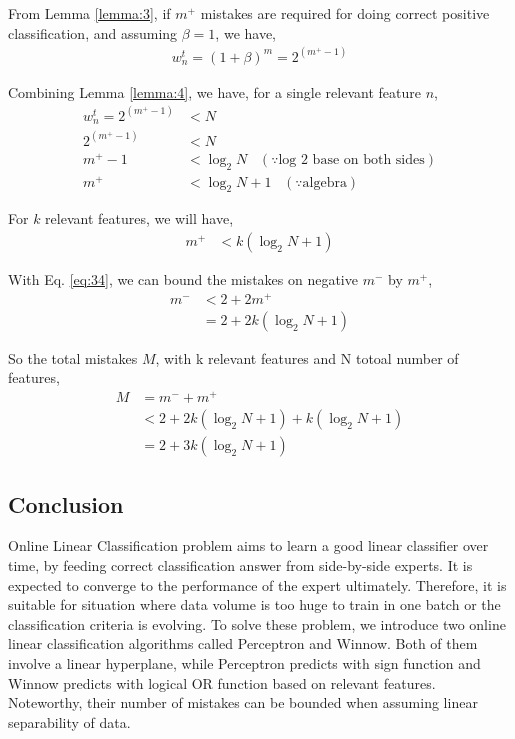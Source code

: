 \documentclass[11pt]{article}
\begin{document}
{From Lemma \ref{lemma:3}, if $m^+$ mistakes are required for doing correct positive classification, and assuming $\beta=1$, we have,
\begin{align}
    w^t_n = (1+\beta)^m = 2^{(m^+ - 1)}
\end{align}

Combining Lemma \ref{lemma:4}, we have, for a single relevant feature $n$, 
\begin{align}
    w^t_n = 2^{(m^+ - 1)} &< N \nonumber \\
    2^{(m^+ - 1)} &< N \nonumber \\
    m^{+}-1 &< \log _{2} N \nonumber \;\;\; (\because \text{log 2 base on both sides}) \\
    m^{+} &< \log _{2} N+1 \;\;\; (\because \text{algebra})
\end{align}

For $k$ relevant features, we will have,
\begin{align}
    m^{+} &< k(\log _{2} N+1)
\end{align}

With Eq. \ref{eq:34}, we can bound the mistakes on negative $m^-$ by $m^+$, 
\begin{align}
    m^{-} &< 2 + 2m^{+} \nonumber \\
     &= 2 + 2k(\log _{2} N+1)
\end{align}

So the total mistakes $M$, with k relevant features and N totoal number of features, 
\begin{align}
    M &= m^{-} + m^{+} \nonumber \\
      &< 2 + 2k(\log _{2} N+1) + k(\log _{2} N+1)  \nonumber \\
      &= 2 + 3k(\log _{2} N+1)
\end{align}
}

\subsection{Conclusion}
Online Linear Classification problem aims to learn a good linear classifier over time, by feeding correct classification answer from side-by-side experts. It is expected to converge to the performance of the expert ultimately. Therefore, it is suitable for situation where data volume is too huge to train in one batch or the classification criteria is evolving. To solve these problem, we introduce two online linear classification algorithms called Perceptron and Winnow. Both of them involve a linear hyperplane, while Perceptron predicts with sign function and Winnow predicts with logical OR function based on relevant features. Noteworthy, their number of mistakes can be bounded when assuming linear separability of data.
\end{document}
